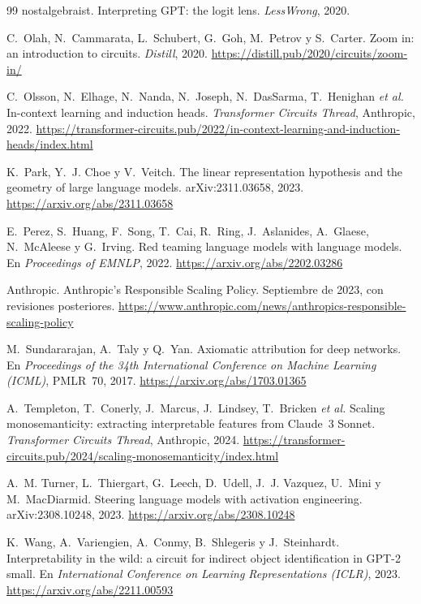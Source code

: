 \begin{thebibliography}{99}
nostalgebraist.
\newblock Interpreting GPT: the logit lens.
\newblock \emph{LessWrong}, 2020.

C.~Olah, N.~Cammarata, L.~Schubert, G.~Goh, M.~Petrov y S.~Carter.
\newblock Zoom in: an introduction to circuits.
\newblock \emph{Distill}, 2020.
\newblock \url{https://distill.pub/2020/circuits/zoom-in/}

C.~Olsson, N.~Elhage, N.~Nanda, N.~Joseph, N.~DasSarma, T.~Henighan \emph{et al.}
\newblock In-context learning and induction heads.
\newblock \emph{Transformer Circuits Thread}, Anthropic, 2022.
\newblock \url{https://transformer-circuits.pub/2022/in-context-learning-and-induction-heads/index.html}

K.~Park, Y.~J. Choe y V.~Veitch.
\newblock The linear representation hypothesis and the geometry of large language models.
\newblock arXiv:2311.03658, 2023.
\newblock \url{https://arxiv.org/abs/2311.03658}

E.~Perez, S.~Huang, F.~Song, T.~Cai, R.~Ring, J.~Aslanides, A.~Glaese, N.~McAleese y G.~Irving.
\newblock Red teaming language models with language models.
\newblock En \emph{Proceedings of EMNLP}, 2022.
\newblock \url{https://arxiv.org/abs/2202.03286}

Anthropic.
\newblock Anthropic's Responsible Scaling Policy.
\newblock Septiembre de 2023, con revisiones posteriores.
\newblock \url{https://www.anthropic.com/news/anthropics-responsible-scaling-policy}

M.~Sundararajan, A.~Taly y Q.~Yan.
\newblock Axiomatic attribution for deep networks.
\newblock En \emph{Proceedings of the 34th International Conference on Machine Learning (ICML)}, PMLR~70, 2017.
\newblock \url{https://arxiv.org/abs/1703.01365}

A.~Templeton, T.~Conerly, J.~Marcus, J.~Lindsey, T.~Bricken \emph{et al.}
\newblock Scaling monosemanticity: extracting interpretable features from Claude~3 Sonnet.
\newblock \emph{Transformer Circuits Thread}, Anthropic, 2024.
\newblock \url{https://transformer-circuits.pub/2024/scaling-monosemanticity/index.html}

A.~M. Turner, L.~Thiergart, G.~Leech, D.~Udell, J.~J. Vazquez, U.~Mini y M.~MacDiarmid.
\newblock Steering language models with activation engineering.
\newblock arXiv:2308.10248, 2023.
\newblock \url{https://arxiv.org/abs/2308.10248}

K.~Wang, A.~Variengien, A.~Conmy, B.~Shlegeris y J.~Steinhardt.
\newblock Interpretability in the wild: a circuit for indirect object identification in GPT-2 small.
\newblock En \emph{International Conference on Learning Representations (ICLR)}, 2023.
\newblock \url{https://arxiv.org/abs/2211.00593}


\end{thebibliography}
